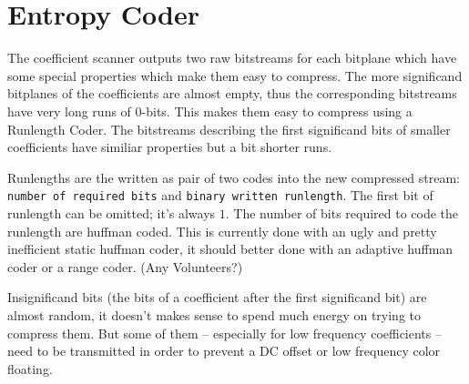 
\section{ Entropy Coder }
\label{entropy}

The coefficient scanner outputs two raw bitstreams for each bitplane which
have some special properties which make them easy to compress.
The more significand bitplanes of the coefficients are almost empty, thus
the corresponding bitstreams have very long runs of $0$-bits. This makes
them easy to compress using a Runlength Coder. The bitstreams describing
the first significand bits of smaller coefficients have similiar properties
but a bit shorter runs.

Runlengths are the written as pair of two codes into the new compressed stream:
\verb|number of required bits| and 
\verb|binary written runlength|. The first bit of runlength can be omitted; 
it's always $1$. The number of bits required to code the runlength are huffman 
coded. This is currently done with an ugly and pretty inefficient static 
huffman coder, it should better done with an adaptive huffman coder or a 
range coder. (Any Volunteers?)

Insignificand bits (the bits of a coefficient after the first significand bit)
are almost random, it doesn't makes sense to spend much energy on trying
to compress them. But some of them -- especially for low frequency 
coefficients -- need to be transmitted in order to prevent a DC offset or low 
frequency color floating.

